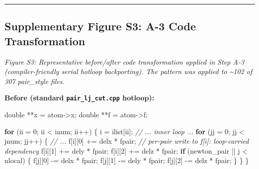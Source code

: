 \documentclass[
  11pt,
]{article}
\newenvironment{Shaded}{}{}
\newcommand{\CommentTok}[1]{\textcolor[rgb]{0.38,0.63,0.69}{\textit{#1}}}
\newcommand{\ControlFlowTok}[1]{\textcolor[rgb]{0.00,0.44,0.13}{\textbf{#1}}}
\newcommand{\DataTypeTok}[1]{\textcolor[rgb]{0.56,0.13,0.00}{#1}}
\newcommand{\DecValTok}[1]{\textcolor[rgb]{0.25,0.63,0.44}{#1}}
\newcommand{\NormalTok}[1]{#1}
\newcommand{\OperatorTok}[1]{\textcolor[rgb]{0.40,0.40,0.40}{#1}}
\begin{document}
\begin{center}\rule{0.5\linewidth}{0.5pt}\end{center}

\subsection{Supplementary Figure S3: A-3 Code
Transformation}\label{supplementary-figure-s3-a-3-code-transformation}

\emph{Figure S3: Representative before/after code transformation applied
in Step A-3 (compiler-friendly serial hotloop backporting). The pattern
was applied to \textasciitilde102 of 307 pair\_style files.}

\textbf{Before (standard \texttt{pair\_lj\_cut.cpp} hotloop):}

\begin{Shaded}
\begin{Highlighting}[]
\DataTypeTok{double} \OperatorTok{**}\NormalTok{x }\OperatorTok{=}\NormalTok{ atom}\OperatorTok{{-}\textgreater{}}\NormalTok{x}\OperatorTok{;}
\DataTypeTok{double} \OperatorTok{**}\NormalTok{f }\OperatorTok{=}\NormalTok{ atom}\OperatorTok{{-}\textgreater{}}\NormalTok{f}\OperatorTok{;}

\ControlFlowTok{for} \OperatorTok{(}\NormalTok{ii }\OperatorTok{=} \DecValTok{0}\OperatorTok{;}\NormalTok{ ii }\OperatorTok{\textless{}}\NormalTok{ inum}\OperatorTok{;}\NormalTok{ ii}\OperatorTok{++)} \OperatorTok{\{}
\NormalTok{  i }\OperatorTok{=}\NormalTok{ ilist}\OperatorTok{[}\NormalTok{ii}\OperatorTok{];}
  \CommentTok{// ... inner loop ...}
  \ControlFlowTok{for} \OperatorTok{(}\NormalTok{jj }\OperatorTok{=} \DecValTok{0}\OperatorTok{;}\NormalTok{ jj }\OperatorTok{\textless{}}\NormalTok{ jnum}\OperatorTok{;}\NormalTok{ jj}\OperatorTok{++)} \OperatorTok{\{}
    \CommentTok{// ...}
\NormalTok{    f}\OperatorTok{[}\NormalTok{i}\OperatorTok{][}\DecValTok{0}\OperatorTok{]} \OperatorTok{+=}\NormalTok{ delx }\OperatorTok{*}\NormalTok{ fpair}\OperatorTok{;}   \CommentTok{// per{-}pair write to f[i]: loop{-}carried dependency}
\NormalTok{    f}\OperatorTok{[}\NormalTok{i}\OperatorTok{][}\DecValTok{1}\OperatorTok{]} \OperatorTok{+=}\NormalTok{ dely }\OperatorTok{*}\NormalTok{ fpair}\OperatorTok{;}
\NormalTok{    f}\OperatorTok{[}\NormalTok{i}\OperatorTok{][}\DecValTok{2}\OperatorTok{]} \OperatorTok{+=}\NormalTok{ delz }\OperatorTok{*}\NormalTok{ fpair}\OperatorTok{;}
    \ControlFlowTok{if} \OperatorTok{(}\NormalTok{newton\_pair }\OperatorTok{||}\NormalTok{ j }\OperatorTok{\textless{}}\NormalTok{ nlocal}\OperatorTok{)} \OperatorTok{\{}
\NormalTok{      f}\OperatorTok{[}\NormalTok{j}\OperatorTok{][}\DecValTok{0}\OperatorTok{]} \OperatorTok{{-}=}\NormalTok{ delx }\OperatorTok{*}\NormalTok{ fpair}\OperatorTok{;}
\NormalTok{      f}\OperatorTok{[}\NormalTok{j}\OperatorTok{][}\DecValTok{1}\OperatorTok{]} \OperatorTok{{-}=}\NormalTok{ dely }\OperatorTok{*}\NormalTok{ fpair}\OperatorTok{;}
\NormalTok{      f}\OperatorTok{[}\NormalTok{j}\OperatorTok{][}\DecValTok{2}\OperatorTok{]} \OperatorTok{{-}=}\NormalTok{ delz }\OperatorTok{*}\NormalTok{ fpair}\OperatorTok{;}
    \OperatorTok{\}}
  \OperatorTok{\}}
\OperatorTok{\}}
\end{Highlighting}
\end{Shaded}
\end{document}
